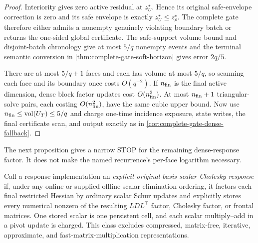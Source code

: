 \begin{proof}
Interiority gives zero active residual at $z_U^\star$.  Hence its original
safe-envelope correction is zero and its safe envelope is exactly
$z_U^\star\leq z_\rho^\star$.  The complete gate therefore either admits a
nonempty genuinely violating boundary batch or returns the one-sided global
certificate.  The safe-support volume bound and disjoint-batch chronology
give at most $5/q$ nonempty events and the terminal semantic conversion in
\cref{thm:complete-gate-soft-horizon} gives error $2q/5$.

There are at most $5/q+1$ faces and each has volume at most $5/q$, so scanning
each face and its boundary once costs $O(q^{-2})$.  If $n_{\rm fin}$ is the
final active dimension, dense block factor updates cost $O(n_{\rm fin}^3)$.
At most $n_{\rm fin}+1$ triangular-solve pairs, each costing
$O(n_{\rm fin}^2)$, have the same cubic upper bound.  Now use
$n_{\rm fin}\leq\operatorname{vol}(U_T)\leq5/q$ and charge one-time incidence exposure,
state writes, the final certificate scan, and output exactly as in
\cref{cor:complete-gate-dense-fallback}.
\end{proof}

The next proposition gives a narrow STOP for the remaining dense-response
factor.  It does not make the named recurrence's per-face logarithm necessary.

Call a response implementation an \emph{explicit original-basis scalar
Cholesky response} if, under any online or supplied offline scalar elimination
ordering, it factors each final restricted Hessian by ordinary scalar Schur
updates and explicitly stores every numerical nonzero of the resulting
$LDL^\top$ factor, Cholesky factor, or frontal matrices.  One stored scalar is
one persistent cell, and each scalar multiply--add in a pivot update is
charged.  This class excludes compressed, matrix-free, iterative,
approximate, and fast-matrix-multiplication representations.


